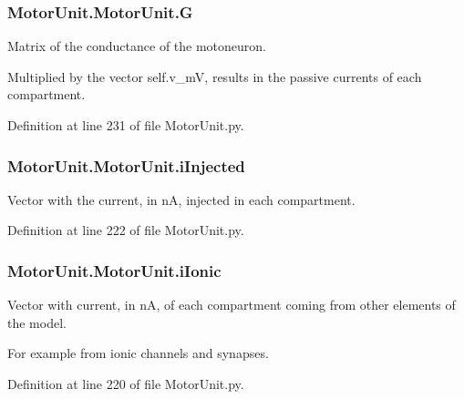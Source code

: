 \subsubsection[{\texorpdfstring{G}{G}}]{\setlength{\rightskip}{0pt plus 5cm}Motor\+Unit.\+Motor\+Unit.\+G}\hypertarget{class_motor_unit_1_1_motor_unit_a9b9f157ab92b47470ca7ec6bd3473dd3}{}\label{class_motor_unit_1_1_motor_unit_a9b9f157ab92b47470ca7ec6bd3473dd3}


Matrix of the conductance of the motoneuron. 

Multiplied by the vector self.\+v\+\_\+mV, results in the passive currents of each compartment. 

Definition at line 231 of file Motor\+Unit.\+py.

\subsubsection[{\texorpdfstring{i\+Injected}{iInjected}}]{\setlength{\rightskip}{0pt plus 5cm}Motor\+Unit.\+Motor\+Unit.\+i\+Injected}\hypertarget{class_motor_unit_1_1_motor_unit_a06045eca379d38892670a491dbac0829}{}\label{class_motor_unit_1_1_motor_unit_a06045eca379d38892670a491dbac0829}


Vector with the current, in nA, injected in each compartment. 



Definition at line 222 of file Motor\+Unit.\+py.

\subsubsection[{\texorpdfstring{i\+Ionic}{iIonic}}]{\setlength{\rightskip}{0pt plus 5cm}Motor\+Unit.\+Motor\+Unit.\+i\+Ionic}\hypertarget{class_motor_unit_1_1_motor_unit_a0541858216e7d01582312f9a7a99d595}{}\label{class_motor_unit_1_1_motor_unit_a0541858216e7d01582312f9a7a99d595}


Vector with current, in nA, of each compartment coming from other elements of the model. 

For example from ionic channels and synapses. 

Definition at line 220 of file Motor\+Unit.\+py.

